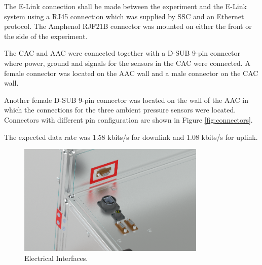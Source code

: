 The E-Link connection shall be made between the experiment and the E-Link system using a RJ45 connection which was supplied by SSC and an Ethernet protocol. The Amphenol RJF21B connector was mounted on either the front or the side of the experiment\cite{BexusManual}.  

The CAC and AAC were connected together with a D-SUB 9-pin connector where power, ground and signals for the sensors in the CAC were connected. A female connector was located on the AAC wall and a male connector on the CAC wall.

Another female D-SUB 9-pin connector was located on the wall of the AAC in which the connections for the three ambient pressure sensors were located. Connectors with different pin configuration are shown in Figure \ref{fig:connectors}.

The expected data rate was 1.58 kbits/s for downlink and 1.08 kbits/s for uplink.

\begin{figure}[H]
    \centering
    \includegraphics[width=0.8\textwidth]{4-experiment-design/img/Mechanical/Figure_Detail_Interfaces.png}
    \caption{Electrical Interfaces.}
    \label{fig:electrical_interfaces}
\end{figure}

\raggedbottom